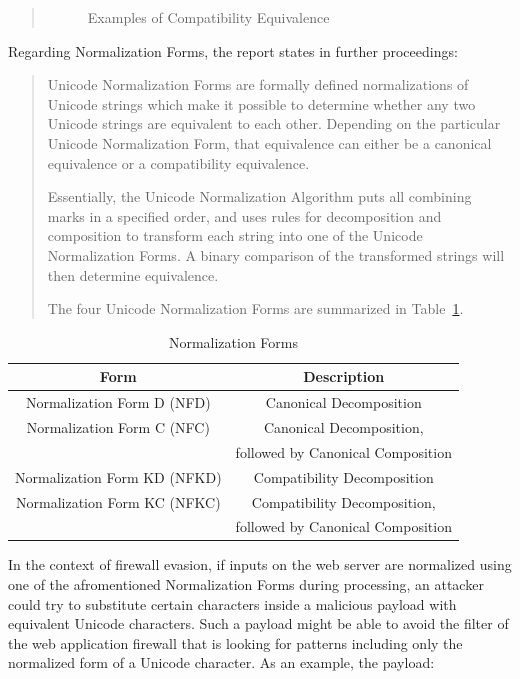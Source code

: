\begin{quote}
\begin{figure}[!h]
		\caption{Examples of Compatibility Equivalence \cite{unicode/normalization}}
		\label{fig:compeq}
	\end{figure}
\end{quote}

Regarding Normalization Forms, the report states in further proceedings:
\begin{quote}
	Unicode Normalization Forms are formally defined normalizations of Unicode strings which make it possible to determine whether any two Unicode strings are equivalent to each other. Depending on the particular Unicode Normalization Form, that equivalence can either be a canonical equivalence or a compatibility equivalence.

	Essentially, the Unicode Normalization Algorithm puts all combining marks in a specified order, and uses rules for decomposition and composition to transform each string into one of the Unicode Normalization Forms. A binary comparison of the transformed strings will then determine equivalence.

	The four Unicode Normalization Forms are summarized in Table~\ref{tab:normform}. \cite{unicode/normalization}
\end{quote}
\begin{table}
	\centering
	\begin{tabular}{ |c|c| }
		\hline
		Form                         & Description                       \\
		\hline
		\hline
		Normalization Form D (NFD)   & Canonical Decomposition           \\
		\hline
		Normalization Form C (NFC)   & Canonical Decomposition,          \\
		                             & followed by Canonical Composition \\
		\hline
		Normalization Form KD (NFKD) & Compatibility Decomposition       \\
		Normalization Form KC (NFKC) & Compatibility Decomposition,      \\
		                             & followed by Canonical Composition \\
		\hline
	\end{tabular}
	\caption{Normalization Forms}
	\label{tab:normform}
\end{table}
In the context of firewall evasion, if inputs on the web server are normalized using one of the afromentioned Normalization Forms during processing, an attacker could try to substitute certain characters inside a malicious payload with equivalent Unicode characters. \cite{medium/allypetitt}
Such a payload might be able to avoid the filter of the web application firewall that is looking for patterns including only the normalized form of a Unicode character. As an example, the payload:

